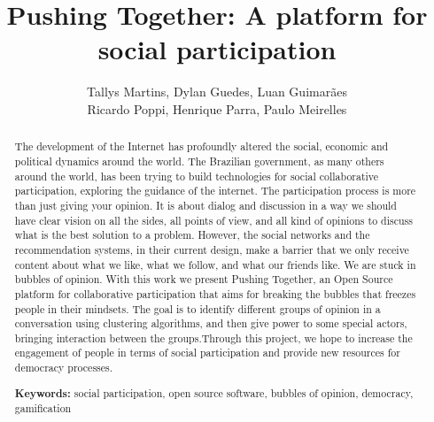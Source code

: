 \documentclass{llncs}
\begin{document}
\sloppy
\title{Pushing Together: A platform for social participation}

\author{Tallys Martins, Dylan Guedes, Luan Guimarães\\
        Ricardo Poppi, Henrique Parra, Paulo Meirelles}



\maketitle
\begin{abstract}


The development of the Internet has profoundly altered the social, economic
and political dynamics around the world. The Brazilian government, as many
others around the world, has been trying to build technologies for social
collaborative participation, exploring the guidance of the internet.
The participation process is more than just giving
your opinion. It is about dialog and discussion in a way we should have clear
vision on all the sides, all points of view, and all kind of opinions to
discuss what is the best solution to a problem. However, the social networks
and the recommendation systems, in their current design, make a barrier that we
only receive content about what we like, what we follow, and what our friends
like. We are stuck in bubbles of opinion.  With this work we present Pushing
Together, an Open Source platform for collaborative participation that aims for
breaking the bubbles that freezes people in their mindsets. The goal is to
identify different groups of opinion in a conversation using clustering
algorithms, and then give power to some special actors, bringing interaction
between the groups.Through this project, we hope to increase the engagement of
people in terms of social participation and provide new resources for democracy
processes.

\textbf{Keywords:} social participation, open source software, bubbles of
opinion, democracy, gamification
\end{abstract}
\end{document}
